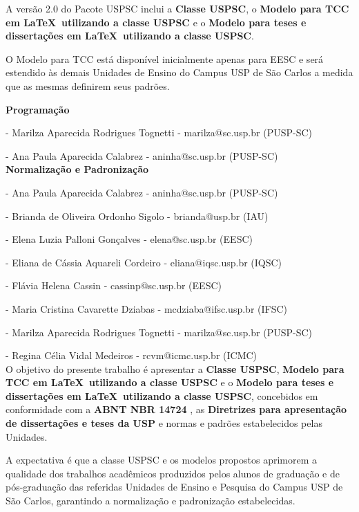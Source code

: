 A versão 2.0 do Pacote USPSC inclui a \textbf{Classe USPSC}, o \textbf{Modelo para TCC em \LaTeX\ utilizando a classe USPSC} e o \textbf{Modelo para teses e dissertações em \LaTeX\ utilizando a classe USPSC}.

O Modelo para TCC está disponível inicialmente apenas para EESC e será estendido às demais Unidades de Ensino do Campus USP de São Carlos a medida que as mesmas definirem seus padrões.

\textbf{Programação}

  - Marilza Aparecida Rodrigues Tognetti - marilza@sc.usp.br (PUSP-SC)
		
  - Ana Paula Aparecida Calabrez - aninha@sc.usp.br (PUSP-SC) \\
	
	
\textbf{Normalização e Padronização}

   - Ana Paula Aparecida Calabrez - aninha@sc.usp.br (PUSP-SC)
	
   - Brianda de Oliveira Ordonho Sigolo - brianda@usp.br (IAU)	
	
   - Elena Luzia Palloni Gonçalves - elena@sc.usp.br (EESC)	
	
   - Eliana de Cássia Aquareli Cordeiro - eliana@iqsc.usp.br (IQSC)	
	
   - Flávia Helena Cassin - cassinp@sc.usp.br (EESC)
	
   - Maria Cristina Cavarette Dziabas - mcdziaba@ifsc.usp.br (IFSC)
	
	 - Marilza Aparecida Rodrigues Tognetti - marilza@sc.usp.br (PUSP-SC)
	
	 - Regina Célia Vidal Medeiros - rcvm@icmc.usp.br (ICMC) \\
	
	O objetivo do presente trabalho é apresentar a \textbf{Classe USPSC}, \textbf{Modelo para TCC em \LaTeX\ utilizando a classe USPSC} e o \textbf{Modelo para teses e dissertações em \LaTeX\ utilizando a classe USPSC}, concebidos em conformidade com a \textbf{ABNT NBR 14724} \cite{nbr14724}, as \textbf{Diretrizes para apresentação de dissertações e teses da USP} \cite{sibi2016} e normas e padrões estabelecidos pelas Unidades. 
	
	A expectativa é que a classe USPSC e os modelos propostos aprimorem a qualidade dos trabalhos acadêmicos produzidos pelos alunos de graduação e de pós-graduação das referidas Unidades de Ensino e Pesquisa do Campus USP de São Carlos, garantindo a normalização e padronização estabelecidas.
	
	
